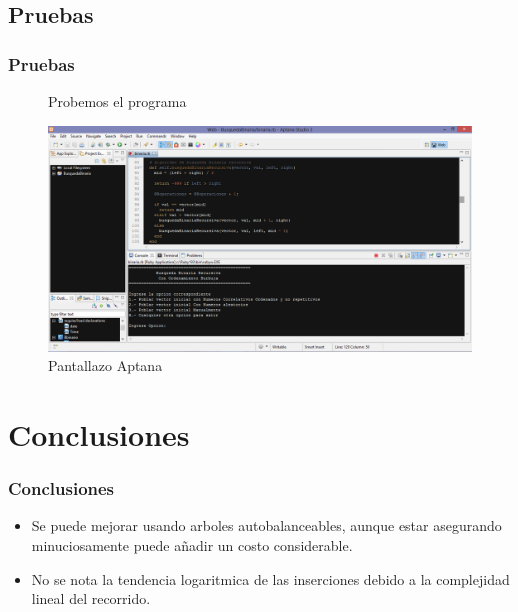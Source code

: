 \documentclass{beamer}
\begin{document}
	\subsection{Pruebas}
	\begin{frame}
		\frametitle{Pruebas}
		\begin{figure}
			\begin{center}
				Probemos el programa 
			\end{center}
  				\centering
    			           \includegraphics[scale=0.25]{Programa.png}
  				\caption{Pantallazo Aptana}
  				\label{fig:lls}
			\end{figure}	
	\end{frame}





\section{Conclusiones}
	\begin{frame}
		\frametitle{Conclusiones}
			\begin{itemize}[<+->]
				\item Se puede mejorar usando arboles autobalanceables, aunque estar asegurando minuciosamente puede añadir un costo considerable.
				\item No se nota la tendencia logaritmica de las inserciones debido a la complejidad lineal del recorrido.
			\end{itemize}
	\end{frame}
\end{document}
